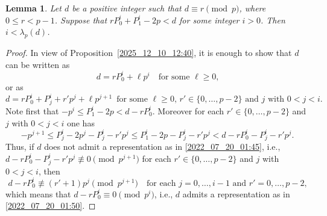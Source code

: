 \documentclass[10pt,a4paper]{amsart}
\newtheorem{lem}{Lemma}
\newcommand{\lam}{\lambda}
\begin{document}
\begin{lem}\label{2022_07_26_22:25}
Let $d$ be a positive integer such that $d\equiv r \pmod p$, where $0 \leq r<p-1$.
Suppose that 
$ r P_0^i + P_1^i - 2p < d$
for some integer $i>0$.
Then $i<\lam_p(d)$.
\end{lem}

\begin{proof}
In view of Proposition~\ref{2025_12_10_12:40},
it is enough to show that $d$ can be written as
\begin{equation}\label{2022_07_20_01:50}
    d= r P_0^{i} + \ell p^{i} \quad \text{for some $\ell\geq 0$,}
\end{equation}
or as
\begin{equation}\label{2022_07_20_01:45}
    d = r P_0^{i} + P_j^{i} + r' p^j + \ell p^{j+1} 
    \,\,\, \text{for some $\ell \geq 0$, $r' \in \{ 0,\dots,p-2 \}$ and $j$ with $0 < j < i$.}
\end{equation}
Note first that 
$-p^i \leq P_1^i - 2p < d - r P_0^i$.
Moreover for each $r' \in \{0,\dots,p-2\}$ and $j$ with $0<j<i$ one has
\[ -p^{j+1} \leq P^i_j -2 p^j - P^i_j - r' p^j \leq P^i_1 -2 p - P^i_j - r' p^j < d - r P_0^i - P_j^i - r' p^j.  \]
Thus, if $d$ does not admit 
a representation as in \eqref{2022_07_20_01:45}, i.e.,
$ d - r P_0^i - P_j^i - r' p^j \not \equiv 0 \pmod{p^{j+1}}$ for each $r' \in \{0,\dots,p-2\}$ and $j$ with $0<j<i$,
then
\[ d - r P_0^{i} \not\equiv (r'+1) p^j \pmod{p^{j+1}} \quad \text{for each $j=0,\dots,i-1$ and $r'=0,\dots,p-2$,} \]
which means that $d - r P_0^{i} \equiv 0 \pmod{p^{i}}$, i.e., 
$d$ admits a representation as in \eqref{2022_07_20_01:50}.
\end{proof}
\end{document}
